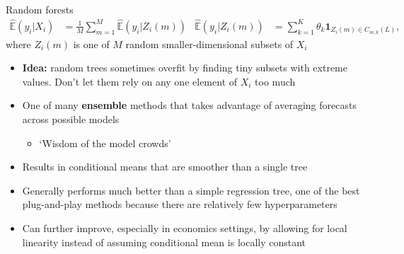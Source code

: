 \documentclass[xcolor=table, aspectratio=169]{beamer}
\newcommand{\alertbf}[1]{\alert{\textbf{#1}}}
\newcommand{\E}{\mathbb{E}}
\begin{document}
        

\begin{frame}[t]{Random forests}
\vspace{-12pt}
\begin{align*}
\hat{\E}( y_i | X_i) &= \frac{1}{M} \sum_{m=1}^M \hat{\E}( y_i | Z_i(m)) & \hat{\E}( y_i | Z_i(m)) &= \sum_{k=1}^K\theta_k \mathbf{1}_{Z_i(m) \in C_{m,k}(L)},
\end{align*}
where $Z_i(m)$ is one of $M$ random smaller-dimensional subsets of $X_i$
\begin{itemize}
    \item \alertbf{Idea:} random trees sometimes overfit by finding tiny subsets with extreme values. Don't let them rely on any one element of $X_i$ too much
    \item One of many \alertbf{ensemble} methods that takes advantage of averaging forecasts across possible models
    \begin{itemize}
        \item `Wisdom of the model crowds'
    \end{itemize}
    \item Results in conditional means that are smoother than a single tree
    \item Generally performs much better than a simple regression tree, one of the best plug-and-play methods because there are relatively few hyperparameters
    \item Can further improve, especially in economics settings, by allowing for local linearity instead of assuming conditional mean is locally constant
\end{itemize}
\end{frame}
\end{document}
